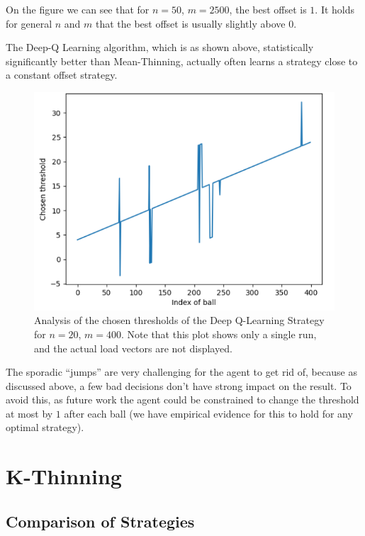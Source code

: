 On the figure we can see that for $n=50$, $m=2500$, the best offset is $1$. It holds for general $n$ and $m$ that the best offset is usually slightly above $0$.

The Deep-Q Learning algorithm, which is as shown above, statistically significantly better than Mean-Thinning, actually often learns a strategy close to a constant offset strategy.


\begin{figure}[hbt!] \label{two-thinning-dqn-thresholds}
    \centering
    \includegraphics[scale=1.0]{Chapter4/Figs/dqn_learnt_thresholds.png}
    \caption{Analysis of the chosen thresholds of the Deep Q-Learning Strategy for $n=20$, $m=400$. Note that this plot shows only a single run, and the actual load vectors are not displayed.}
\end{figure}


The sporadic ``jumps'' are very challenging for the agent to get rid of, because as discussed above, a few bad decisions don't have strong impact on the result. To avoid this, as future work the agent could be constrained to change the threshold at most by $1$ after each ball (we have empirical evidence for this to hold for any optimal strategy).



\section{K-Thinning}



\subsection{Comparison of Strategies}


